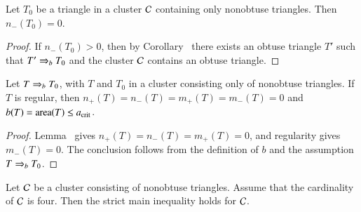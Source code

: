 \begin{lemma} 
  Let $T_0$ be a triangle in a cluster $\mathcal C$ containing only nonobtuse
  triangles.  Then $n_-(T_0)=0$.
\end{lemma}

\begin{proof} 
  If $n_-(T_0)>0$, then by Corollary~ there
  exists an obtuse triangle $T'$ such that $T'\Rightarrow_{b} T_0$ and the
  cluster $\mathcal C$ contains an obtuse triangle.
\end{proof}

\begin{lemma}
  Let $T\Rightarrow_{b} T_0$, with $T$ and $T_0$ in a cluster consisting
  only of nonobtuse triangles. If $T$ is regular, then
  $n_+(T)=n_-(T)=m_+(T)=m_-(T)=0$ and
  $b(T)={\operatorname{area}}(T)\le a_\text{crit}$.
\end{lemma}

\begin{proof}
  Lemma~ gives $n_+(T)=n_-(T)=m_+(T)=0$,
  and regularity gives $m_-(T)=0$. The conclusion follows from
  the definition of $b$ and the assumption $T\Rightarrow_{b} T_0$.
\end{proof}

\begin{lemma}
  Let $\mathcal C$ be a cluster consisting of nonobtuse triangles.  Assume
  that the cardinality of $\mathcal C$ is four.  Then the strict main
  inequality holds for $\mathcal C$.
\end{lemma}

